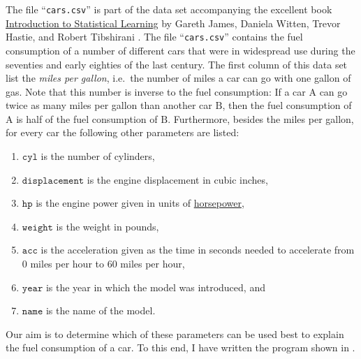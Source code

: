 The file ``\texttt{cars.csv}'' is part of the data set accompanying the excellent book 
\href{http://www-bcf.usc.edu/~gareth/ISL/index.html}{Introduction to Statistical Learning} by Gareth James,
Daniela Witten, Trevor Hastie, and Robert Tibshirani \cite{james:2014}.  The file 
``\texttt{cars.csv}''  contains the fuel consumption of a number of different cars that were in widespread use during
the seventies and early eighties of the last century.  The first column of this data set list the 
\emph{\color{blue}miles per gallon}, i.e.~the number of miles a car can go with one gallon of gas.  Note that
this number is inverse to the fuel consumption:  If a car $\mathrm{A}$ can go twice as many miles per gallon
than another car $\mathrm{B}$, then the fuel consumption of $\mathrm{A}$ is half of the fuel consumption of
$\mathrm{B}$. Furthermore, besides the miles per gallon, for every car the following other parameters are listed:
\begin{enumerate}
\item $\mathtt{cyl}$ is the number of cylinders,
\item $\mathtt{displacement}$ is the engine displacement in cubic inches, 
\item $\mathtt{hp}$ is the engine power given in units of \href{https://en.wikipedia.org/wiki/Horsepower}{horsepower},
\item $\mathtt{weight}$ is the weight in pounds,
\item $\mathtt{acc}$ is the acceleration given as the time in seconds needed to accelerate from 0 miles per
      hour to 60 miles per hour,
\item $\mathtt{year}$ is the year in which the model was introduced, and
\item $\mathtt{name}$ is the name of the model.
\end{enumerate}
Our aim is to determine which of these parameters can be used best to explain the fuel consumption of a car.  To this
end, I have written the program shown in .


